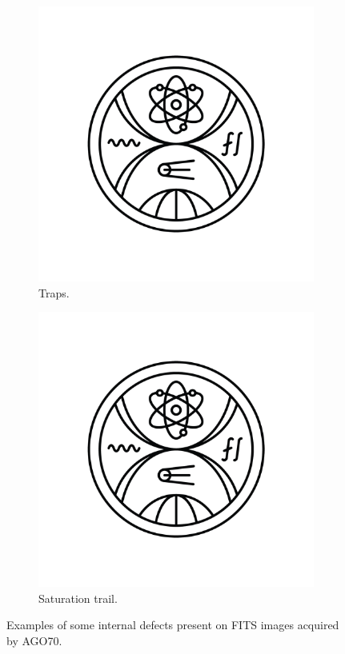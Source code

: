 {\begin{figure}[!h]
	\vspace*{4mm}
	
	\begin{subfigure}{.3\textwidth}
		\centering
		\includegraphics[width=\textwidth]{images/FMFI_logo_BP.png}
		\caption{Traps.}
		\label{fig:trap}
	\end{subfigure}
	\begin{subfigure}{.3\textwidth}
		\centering
		\includegraphics[width=\textwidth]{images/FMFI_logo_BP.png}
		\caption{Saturation trail.}
		\label{fig:saturationtrail}
	\end{subfigure}
	\caption{Examples of some internal defects present on FITS images acquired by AGO70.}
	\label{fig:internaldefects}
\end{figure}
}